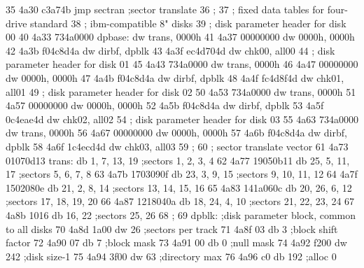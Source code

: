  35      4a30 c3a74b               jmp    sectran        ;sector translate
 36                       ;
 37                       ;        fixed data tables for four-drive standard
 38                       ;        ibm-compatible 8" disks
 39                       ;        disk parameter header for disk 00
 40      4a33 734a0000    dpbase:  dw     trans, 0000h
 41      4a37 00000000             dw     0000h, 0000h
 42      4a3b f04c8d4a             dw     dirbf, dpblk
 43      4a3f ec4d704d             dw     chk00, all00
 44                       ;        disk parameter header for disk 01
 45      4a43 734a0000             dw     trans, 0000h
 46      4a47 00000000             dw     0000h, 0000h
 47      4a4b f04c8d4a             dw     dirbf, dpblk
 48      4a4f fc4d8f4d             dw     chk01, all01
 49                       ;        disk parameter header for disk 02
 50      4a53 734a0000             dw     trans, 0000h
 51      4a57 00000000             dw     0000h, 0000h
 52      4a5b f04c8d4a             dw     dirbf, dpblk
 53      4a5f 0c4eae4d             dw     chk02, all02
 54                       ;        disk parameter header for disk 03
 55      4a63 734a0000             dw     trans, 0000h
 56      4a67 00000000             dw     0000h, 0000h
 57      4a6b f04c8d4a             dw     dirbf, dpblk
 58      4a6f 1c4ecd4d             dw     chk03, all03
 59                       ;
 60                       ;        sector translate vector
 61      4a73 01070d13    trans:   db     1, 7, 13, 19   ;sectors 1, 2, 3, 4
 62      4a77 19050b11             db     25, 5, 11, 17  ;sectors 5, 6, 7, 8
 63      4a7b 1703090f             db     23, 3, 9, 15   ;sectors 9, 10, 11, 12
 64      4a7f 1502080e             db     21, 2, 8, 14   ;sectors 13, 14, 15, 16
 65      4a83 141a060c             db     20, 26, 6, 12  ;sectors 17, 18, 19, 20
 66      4a87 1218040a             db     18, 24, 4, 10  ;sectors 21, 22, 23, 24
 67      4a8b 1016                 db     16, 22         ;sectors 25, 26
 68                       ;
 69                       dpblk:   ;disk parameter block, common to all disks
 70      4a8d 1a00                 dw     26             ;sectors per track
 71      4a8f 03                   db     3              ;block shift factor
 72      4a90 07                   db     7              ;block mask
 73      4a91 00                   db     0              ;null mask
 74      4a92 f200                 dw     242            ;disk size-1
 75      4a94 3f00                 dw     63             ;directory max
 76      4a96 c0                   db     192            ;alloc 0
